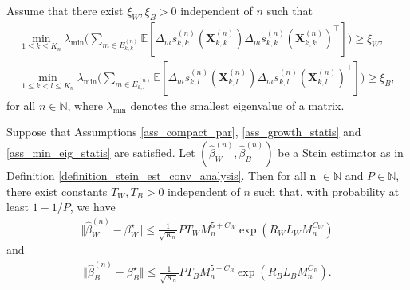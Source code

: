 \documentclass[10pt,a4paper]{amsart}
\begin{document}
\begin{Assumption}  \label{ass_min_eig_statis}
Assume that there exist $\xi_W,\xi_B>0$ independent of $n$ such that
\begin{align*}
    \min_{1 \leq k \leq K_n} \lambda_\mathrm{min} \bigg( \sum_{m \in E_{k,k}^{(n)}} \mathbb{E}[\Delta_m s_{k,k}^{(n)}(\mathbf{X}_{k,k}^{(n)}) \Delta_m s_{k,k}^{(n)}(\mathbf{X}_{k,k}^{(n)})^{\top}] \bigg) \geq \xi_W,  \\
    \min_{1 \leq k<l \leq K_n} \lambda_{\mathrm{min}} \bigg( \sum_{m \in E_{k,l}^{(n)}} \mathbb{E}[\Delta_m s_{k,l}^{(n)}(\mathbf{X}_{k,l}^{(n)}) \Delta_m s_{k,l}^{(n)}(\mathbf{X}_{k,l}^{(n)})^{\top}] \bigg) \geq \xi_B,
\end{align*}
for all $n \in \mathbb{N}$,  where $\lambda_{\mathrm{min}}$ denotes the smallest eigenvalue of a matrix.
\end{Assumption}

\begin{Theorem} \label{theorem_standard_error}
    Suppose that Assumptions \ref{ass_compact_par}, \ref{ass_growth_statis} and \ref{ass_min_eig_statis} are satisfied. Let $( \hat{\beta}_W^{(n)},  \hat{\beta}_B^{(n)})$ be a Stein estimator as in Definition \ref{definition_stein_est_conv_analysis}. Then for all n $ \in  \mathbb{N}$ and $P \in \mathbb{N}$, there exist constants $T_W, T_B>0$ independent of $n$ such that, with probability at least $1-1/P$,  we have
    \begin{align*}
        \Vert \hat{\beta}_W^{(n)} - \beta_W^{\star} \Vert \leq \frac{1}{\sqrt{K_n}} {P T_W M_n^{5+C_W} \exp(R_W L_W M_n^{C_W} )} 
    \end{align*}
    and
    \begin{align*}
        \Vert \hat{\beta}_B^{(n)} - \beta_B^{\star} \Vert \leq \frac{1}{\sqrt{K_n}} {P T_B  M_n^{5+C_B}\exp(R_B L_B M_n^{C_B} )}.
    \end{align*}
\end{Theorem}
\end{document}

